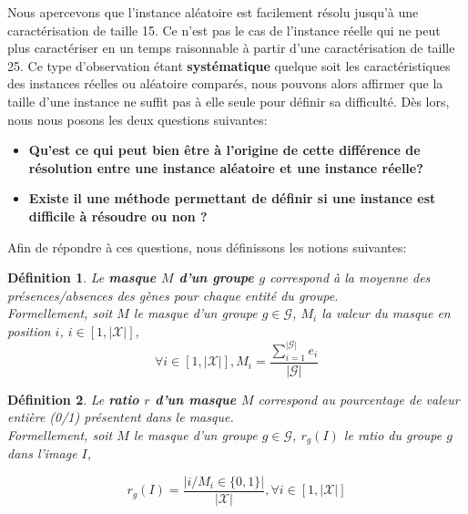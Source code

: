 \documentclass[a4paper,10pt]{article}
\newtheorem{definition}{Définition}
\begin{document}
Nous apercevons que l'instance aléatoire est facilement résolu jusqu'à une caractérisation de taille 15. Ce n'est pas le cas de l'instance réelle qui ne peut plus caractériser en un temps raisonnable à partir d'une caractérisation de taille 25. Ce type d'observation étant \textbf{systématique} quelque soit les caractéristiques des instances réelles ou aléatoire comparés, nous pouvons alors affirmer que la taille d'une instance ne suffit pas à elle seule pour définir sa difficulté. Dès lors, nous nous posons les deux questions suivantes:\\

\begin{itemize}
\item \textbf{Qu'est ce qui peut bien être à l'origine de cette différence de résolution entre une instance aléatoire et une instance réelle?}
\item \textbf{Existe il une méthode permettant de définir si une instance est difficile à résoudre ou non ?}\\
\end{itemize}
Afin de répondre à ces questions, nous définissons les notions suivantes:

\begin{definition}
Le \textbf{masque $M$ d'un groupe $g$} correspond à la moyenne des présences/absences des gènes pour chaque entité du groupe.\\
Formellement, soit $M$ le masque d'un groupe $g \in \mathcal{G}$, $M_i$ la valeur du masque en position $i$, $i \in [1,|\mathcal{X}|]$,
$$\forall i \in  [1, |\mathcal{X}|], M_i= \frac{\sum_{i=1}^{|\mathcal{G}|}e_i}{|\mathcal{G}|} $$
\end{definition}

\begin{definition}
Le \textbf{ratio $r$ d'un masque $M$} correspond au pourcentage de valeur entière (0/1) présentent dans le masque.\\
Formellement, soit $M$ le masque d'un groupe $g \in \mathcal{G}$, $r_g(I)$ le ratio du groupe $g$ dans l'image $I$,
\begin{center}
$$ r_g(I)=\frac{|{i / M_i \in \{0,1\}}|}{|\mathcal{X}|},\forall i \in [1,|\mathcal{X}|]$$
\end{center}
\end{definition}
\end{document}
